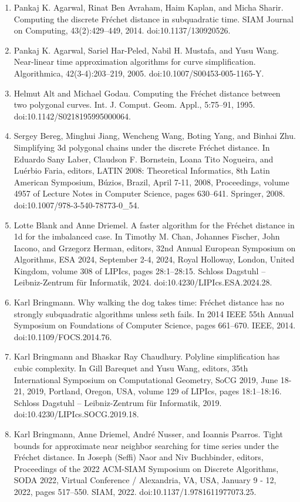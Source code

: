 \documentclass[10pt,a4paper]{article}
\begin{document}
\begin{enumerate}
\item[]  [1]  Pankaj K. Agarwal, Rinat Ben Avraham, Haim Kaplan, and Micha Sharir.  Computing the discrete Fréchet distance in subquadratic time.  SIAM Journal on Computing, 43(2):429–449, 2014.  doi:10.1137/130920526.  
\item[]  [2]  Pankaj K. Agarwal, Sariel Har-Peled, Nabil H. Mustafa, and Yusu Wang.  Near-linear time approximation algorithms for curve simplification.  Algorithmica, 42(3-4):203–219, 2005.  doi:10.1007/S00453-005-1165-Y.  
\item[]  [3]  Helmut Alt and Michael Godau.  Computing the Fréchet distance between two polygonal curves.  Int. J. Comput. Geom. Appl., 5:75–91, 1995.  doi:10.1142/S0218195995000064.  
\item[]  [4]  Sergey Bereg, Minghui Jiang, Wencheng Wang, Boting Yang, and Binhai Zhu.  Simplifying 3d polygonal chains under the discrete Fréchet distance.  In Eduardo Sany Laber, Claudson F. Bornstein, Loana Tito Nogueira, and Luérbio Faria, editors, LATIN 2008: Theoretical Informatics, 8th Latin American Symposium, Búzios, Brazil, April 7-11, 2008, Proceedings, volume 4957 of Lecture Notes in Computer Science, pages 630–641. Springer, 2008.  doi:10.1007/978-3-540-78773-0\_54.  
\item[]  [5]  Lotte Blank and Anne Driemel.  A faster algorithm for the Fréchet distance in 1d for the imbalanced case.  In Timothy M. Chan, Johannes Fischer, John Iacono, and Grzegorz Herman, editors, 32nd Annual European Symposium on Algorithms, ESA 2024, September 2-4, 2024, Royal Holloway, London, United Kingdom, volume 308 of LIPIcs, pages 28:1–28:15. Schloss Dagstuhl – Leibniz-Zentrum für Informatik, 2024.  doi:10.4230/LIPIcs.ESA.2024.28.  
\item[]  [6]  Karl Bringmann.  Why walking the dog takes time: Fréchet distance has no strongly subquadratic algorithms unless seth fails.  In 2014 IEEE 55th Annual Symposium on Foundations of Computer Science, pages 661–670. IEEE, 2014.  doi:10.1109/FOCS.2014.76.  
\item[]  [7]  Karl Bringmann and Bhaskar Ray Chaudhury.  Polyline simplification has cubic complexity.  In Gill Barequet and Yusu Wang, editors, 35th International Symposium on Computational Geometry, SoCG 2019, June 18-21, 2019, Portland, Oregon, USA, volume 129 of LIPIcs, pages 18:1–18:16. Schloss Dagstuhl – Leibniz-Zentrum für Informatik, 2019.  doi:10.4230/LIPIcs.SOCG.2019.18.  
\item[]  [8]  Karl Bringmann, Anne Driemel, André Nusser, and Ioannis Psarros.  Tight bounds for approximate near neighbor searching for time series under the Fréchet distance.  In Joseph (Seffi) Naor and Niv Buchbinder, editors, Proceedings of the 2022 ACM-SIAM Symposium on Discrete Algorithms, SODA 2022, Virtual Conference / Alexandria, VA, USA, January 9 - 12, 2022, pages 517–550. SIAM, 2022.  doi:10.1137/1.9781611977073.25.  

\end{enumerate}
\end{document}
